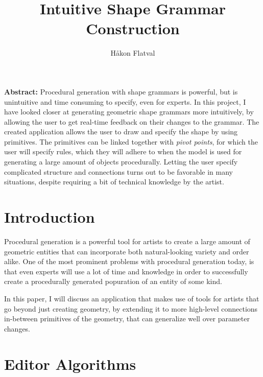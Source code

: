 \documentclass[english]{article}
\begin{document}
\title{Intuitive Shape Grammar Construction}

\author{Håkon Flatval}

\maketitle
\thispagestyle{fancy}

\begin{center}

  {\bf \Large Abstract:} Procedural generation with shape grammars is powerful, but is unintuitive and time consuming to specify, even for experts. In this project, I have looked closer at generating geometric shape grammars more intuitively, by allowing the user to get real-time feedback on their changes to the grammar. The created application allows the user to draw and specify the shape by using primitives. The primitives can be linked together with \textit{pivot points}, for which the user will specify rules, which they will adhere to when the model is used for generating a large amount of objects procedurally. Letting the user specify complicated structure and connections turns out to be favorable in many situations, despite requiring a bit of technical knowledge by the artist.
  
\end{center}

\section{Introduction}

Procedural generation is a powerful tool for artists to create a large amount of geometric entities that can incorporate both natural-looking variety and order alike. One of the most prominent problems with procedural generation today, is that even experts will use a lot of time and knowledge in order to successfully create a procedurally generated popuration of an entity of some kind.

In this paper, I will discuss an application that makes use of tools for artists that go beyond just creating geometry, by extending it to more high-level connections in-between primitives of the geometry, that can generalize well over parameter changes.

\section{Editor Algorithms}
\end{document}
